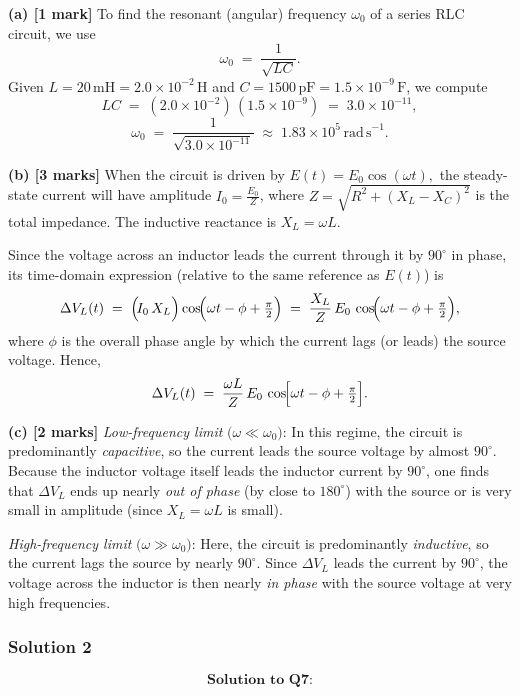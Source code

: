 \documentclass{article}
\begin{document}
\textbf{(a) [1 mark]} 
To find the resonant (angular) frequency \(\omega_0\) of a series RLC circuit, we use
\[
\omega_0 \;=\; \frac{1}{\sqrt{LC}}.
\]
Given \(L = 20\,\mathrm{mH} = 2.0\times10^{-2}\,\mathrm{H}\) and 
\(C = 1500\,\mathrm{pF} = 1.5\times10^{-9}\,\mathrm{F}\), we compute
\[
LC \;=\; (2.0\times10^{-2})\,(1.5\times10^{-9}) 
\;=\; 3.0\times10^{-11},
\]
\[
\omega_0 \;=\; \frac{1}{\sqrt{3.0\times10^{-11}}}
\;\approx\; 1.83\times10^{5}\,\mathrm{rad\,s}^{-1}.
\]

\textbf{(b) [3 marks]}
When the circuit is driven by 
\(
E(t) = E_0 \cos(\omega t),
\)
the steady-state current will have amplitude 
\(\displaystyle I_0 = \frac{E_0}{Z}\),
where 
\(\displaystyle Z = \sqrt{R^2 + (X_L - X_C)^2}\)
is the total impedance. The inductive reactance is 
\(\displaystyle X_L = \omega L.\)

Since the voltage across an inductor leads the current through it by \(90^\circ\) in phase, its time-domain expression (relative to the same reference as \(E(t)\)) is
\[
\Delta V_L(t)
\;=\;
\Bigl(\!I_0\,X_L\Bigr)\cos\!\Bigl(\omega t - \phi + \tfrac{\pi}{2}\Bigr)
\;=\;
\frac{X_L}{Z}\,E_0\,
\cos\!\Bigl(\omega t - \phi + \tfrac{\pi}{2}\Bigr),
\]
where \(\phi\) is the overall phase angle by which the current lags (or leads) the source voltage. Hence,
\[
\Delta V_L(t) 
\;=\;
\frac{\omega L}{Z}\,E_0\,
\cos\!\Bigl[\omega t - \phi + \tfrac{\pi}{2}\Bigr].
\]

\textbf{(c) [2 marks]}
\emph{Low-frequency limit} \(\bigl(\omega \ll \omega_{0}\bigr)\):
In this regime, the circuit is predominantly \emph{capacitive}, so the current leads the source voltage by almost \(90^\circ\).  Because the inductor voltage itself leads the inductor current by \(90^\circ\), one finds that \(\Delta V_L\) ends up nearly \emph{out of phase} (by close to \(180^\circ\)) with the source or is very small in amplitude (since \(X_L = \omega L\) is small).  

\emph{High-frequency limit} \(\bigl(\omega \gg \omega_{0}\bigr)\):
Here, the circuit is predominantly \emph{inductive}, so the current lags the source by nearly \(90^\circ\).  Since \(\Delta V_L\) leads the current by \(90^\circ\), the voltage across the inductor is then nearly \emph{in phase} with the source voltage at very high frequencies.


\subsubsection{Solution 2}
\[
\textbf{Solution to Q7:}
\]
\end{document}

